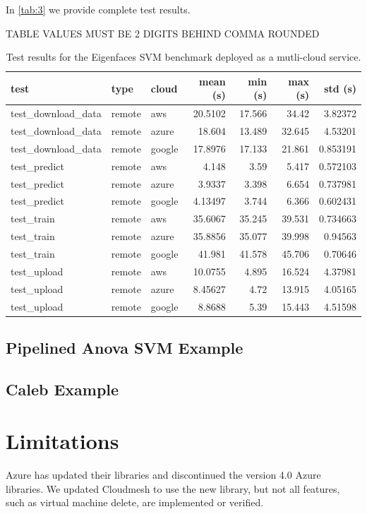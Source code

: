 In \ref{tab:3} we provide complete test results.

\begin{table}[htb]
\caption{Test results for the Eigenfaces SVM benchmark deployed
  as a mutli-cloud service.}
\label{tabe:3}

TABLE VALUES MUST BE 2 DIGITS BEHIND COMMA ROUNDED

\begin{tabular}[]{@{}lllrrrr@{}}
\toprule
test & type & cloud & mean (s) & min (s) & max (s) & std
(s)\tabularnewline
\midrule
test\_download\_data & remote & aws & 20.5102 & 17.566 & 34.42 &
3.82372\tabularnewline
test\_download\_data & remote & azure & 18.604 & 13.489 & 32.645 &
4.53201\tabularnewline
test\_download\_data & remote & google & 17.8976 & 17.133 & 21.861 &
0.853191\tabularnewline
test\_predict & remote & aws & 4.148 & 3.59 & 5.417 &
0.572103\tabularnewline
test\_predict & remote & azure & 3.9337 & 3.398 & 6.654 &
0.737981\tabularnewline
test\_predict & remote & google & 4.13497 & 3.744 & 6.366 &
0.602431\tabularnewline
test\_train & remote & aws & 35.6067 & 35.245 & 39.531 &
0.734663\tabularnewline
test\_train & remote & azure & 35.8856 & 35.077 & 39.998 &
0.94563\tabularnewline
test\_train & remote & google & 41.981 & 41.578 & 45.706 &
0.70646\tabularnewline
test\_upload & remote & aws & 10.0755 & 4.895 & 16.524 &
4.37981\tabularnewline
test\_upload & remote & azure & 8.45627 & 4.72 & 13.915 &
4.05165\tabularnewline
test\_upload & remote & google & 8.8688 & 5.39 & 15.443 &
4.51598\tabularnewline
\bottomrule
\end{tabular}
\end{table}

\subsection{Pipelined Anova SVM
Example}\label{pipelined-anova-svm-example}

\subsection{Caleb Example}\label{caleb-example}

\section{Limitations}\label{limitations}

Azure has updated their libraries and discontinued the version 4.0 Azure
libraries. We updated Cloudmesh to use the new library, but not all
features, such as virtual machine delete, are implemented or verified.

